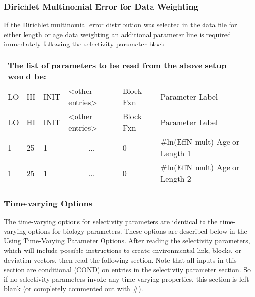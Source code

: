 \hypertarget{Dirichletparameter}{}
\subsubsection{Dirichlet Multinomial Error for Data Weighting}
If the Dirichlet multinomial error distribution was selected in the data file for either length or age data weighting an additional parameter line is required immediately following the selectivity parameter block. 
	
\begin{longtable}{p{1cm} p{1cm} p{1cm} p{2.9cm}  p{1.8cm}  p{6.5cm}}
	\multicolumn{6}{l}{The list of parameters to be read from the above setup would be:}\\
	\hline
	LO \Tstrut & HI & INIT  &  <other entries> & Block Fxn & Parameter Label\Bstrut\\
	\hline
	\endfirsthead
	
	\hline
	LO \Tstrut & HI & INIT & <other entries> & Block Fxn & Parameter Label\Bstrut\\
	\hline
	\endhead

	1    & 25 & 1  & \multicolumn{1}{c}{...}  & 0   & \#ln(EffN mult) Age or Length 1 \Tstrut\\
	1    & 25 & 1  & \multicolumn{1}{c}{...}  & 0   & \#ln(EffN mult) Age or Length 2\Bstrut\\
	\hline
\end{longtable}


\subsubsection{Time-varying Options}
The time-varying options for selectivity parameters are identical to the time-varying options for biology parameters. These options are described below in the \hyperlink{TVpara}{Using Time-Varying Parameter Options}. After reading the selectivity parameters, which will include possible instructions to create environmental link, blocks, or deviation vectors, then read the following section.  Note that all inputs in this section are conditional (COND) on entries in the selectivity parameter section.  So if no selectivity parameters invoke any time-varying properties, this section is left blank (or completely commented out with \#).




